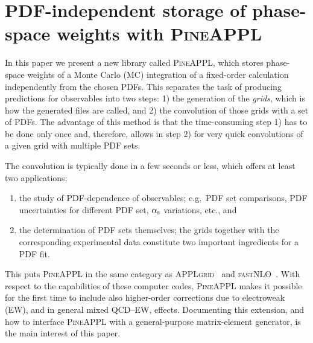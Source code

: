 \section{PDF-independent storage of phase-space weights with \texorpdfstring{\textsc{PineAPPL}}{PineAPPL}}
\label{sec:pineappl}

In this paper we present a new library called \textsc{PineAPPL}, which stores phase-space weights of a Monte Carlo (MC) integration of a fixed-order calculation independently from the chosen PDFs.
This separates the task of producing predictions for observables into two steps: 1) the generation of the \emph{grids}, which is how the generated files are called, and 2) the convolution of those grids with a set of PDFs.
The advantage of this method is that the time-consuming step 1) has to be done only once and, therefore, allows in step 2) for very quick convolutions of a given grid with multiple PDF sets.

The convolution is typically done in a few seconds or less, which offers at least two applications:
\begin{enumerate}
\item the study of PDF-dependence of observables; e.g.\ PDF set comparisons, PDF uncertainties for different PDF set, $\alpha_\mathrm{s}$ variations, etc., and
\item the determination of PDF sets themselves; the grids together with the corresponding experimental data constitute two important ingredients for a PDF fit.
\end{enumerate}
This puts \textsc{PineAPPL} in the same category as \textsc{APPLgrid}~\cite{Carli:2010rw} and \textsc{fastNLO}~\cite{Kluge:2006xs,Wobisch:2011ij,Britzger:2012bs}.
With respect to the capabilities of these computer codes, \textsc{PineAPPL} makes it possible for the first time to include also higher-order corrections due to electroweak (EW), and in general mixed QCD--EW, effects.
Documenting this extension, and how to interface \textsc{PineAPPL} with a general-purpose matrix-element generator, is the main interest of this paper.

